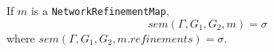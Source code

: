 \documentclass[10pt, a4paper]{isov2}
\newcommand*{\syntax}[1]{\texttt{#1}}
\newcommand{\semdom}[1]{
\begin{center}
\fbox{$#1$}
\end{center}
}
\newcommand{\current}{\mathit{current}}
\begin{document}
If $m$ is a \syntax{NetworkRefinementMap},
$$sem(\Gamma, G_1,G_2, m) = \sigma$$
\noindent 
where 
$sem(\Gamma,G_1,G_2, m.refinements) = \sigma$.                    



%
%
%
%
%
%
%
%
%
\end{document}

